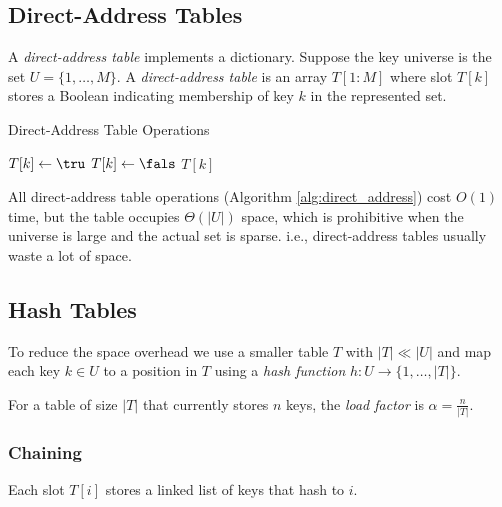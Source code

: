 \subsection{Direct-Address Tables}
\label{subsec:direct_address}
\begin{definition}
A \emph{direct-address table} implements a dictionary.
Suppose the key universe is the set \(U=\{1,\dots,M\}\).
A \emph{direct-address table} is an array \(T[1:M]\) where slot \(T[k]\) stores a Boolean indicating membership of key \(k\) in the represented set.
\end{definition}
\begin{algorithm}[htb]
  \caption{Direct-Address Table Operations}
  \label{alg:direct_address}
  \begin{algorithmic}[1]
      \State $T[k] \gets \tru$  \EndFunction
      \State $T[k] \gets \fals$ \EndFunction
      \State \Return $T[k]$     \EndFunction
  \end{algorithmic}
\end{algorithm}
All direct-address table operations (Algorithm \ref{alg:direct_address}) cost \(O(1)\) time, but the table occupies \(\Theta(|U|)\) space, which is prohibitive when the universe is large and the actual set is sparse.
i.e., direct-address tables usually waste a lot of space.


\subsection{Hash Tables}
\label{subsec:hash_tables}

To reduce the space overhead we use a smaller table \(T\) with \(|T| \ll |U|\) and map each key \(k\in U\) to a position in \(T\) using a
\emph{hash function} \(h:U\rightarrow\{1,\dots,|T|\}\).

\begin{definition}
For a table of size \(|T|\) that currently stores \(n\) keys, the
\emph{load factor} is \(\alpha = \frac{n}{|T|}\).
\end{definition}

\subsubsection{Chaining}
Each slot \(T[i]\) stores a linked list of keys that hash to \(i\).




